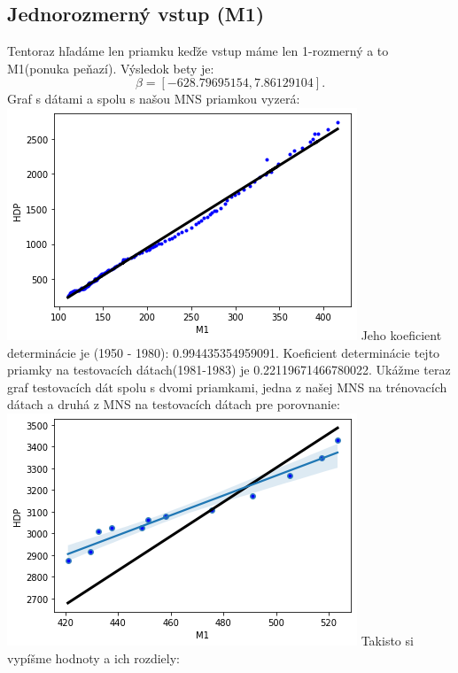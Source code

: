 \documentclass{article}
\begin{document}
\subsection{Jednorozmerný vstup (M1)}
Tentoraz hľadáme len priamku keďže vstup máme len 1-rozmerný a to M1(ponuka peňazí). Výsledok bety je:\[ \beta = [-628.79695154,    7.86129104].\] Graf s dátami a spolu s našou MNS priamkou vyzerá:\\\includegraphics[width=\textwidth]{MNS_1roz_test.png} Jeho koeficient determinácie je (1950 - 1980): 0.994435354959091. Koeficient determinácie tejto priamky na testovacích dátach(1981-1983) je 0.22119671466780022. Ukážme teraz graf testovacích dát spolu s dvomi priamkami, jedna z našej MNS na trénovacích dátach a druhá z MNS na testovacích dátach pre porovnanie: \\\includegraphics[width=\textwidth]{MNS_test_2.png} Takisto si vypíšme hodnoty a ich rozdiely:\\
\end{document}
